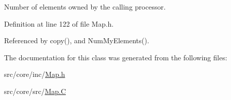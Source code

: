 Number of elements owned by the calling processor. 



Definition at line 122 of file Map.\-h.



Referenced by copy(), and Num\-My\-Elements().



The documentation for this class was generated from the following files\-:\begin{DoxyCompactItemize}
\item 
src/core/inc/\hyperlink{_map_8h}{Map.\-h}\item 
src/core/src/\hyperlink{_map_8_c}{Map.\-C}\end{DoxyCompactItemize}
